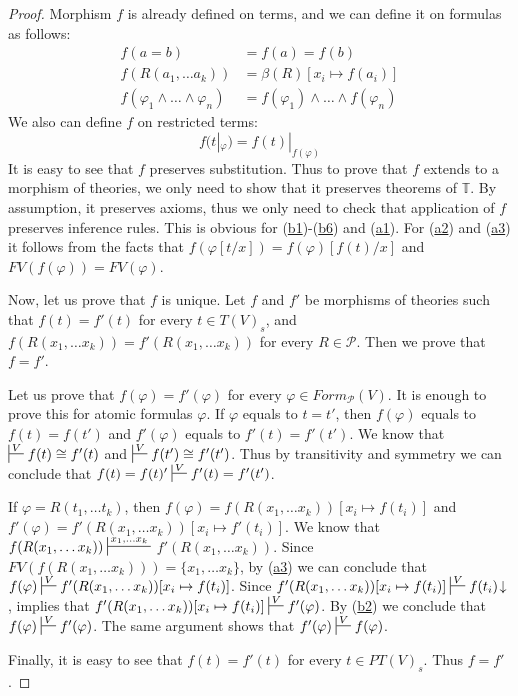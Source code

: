 \documentclass[reqno]{amsart}
\newcommand{\axref}[1]{(\hyperref[ax:#1]{#1})}
\theoremstyle{definition}
\theoremstyle{remark}
\numberwithin{figure}{section}
\begin{document}
\begin{proof}
Morphism $f$ is already defined on terms, and we can define it on formulas as follows:
\begin{align*}
f(a = b) & = f(a) = f(b) \\
f(R(a_1, \ldots a_k)) & = \beta(R)[x_i \mapsto f(a_i)] \\
f(\varphi_1 \land \ldots \land \varphi_n) & = f(\varphi_1) \land \ldots \land f(\varphi_n)
\end{align*}
We also can define $f$ on restricted terms:
\[ f(t|_\varphi) = f(t)|_{f(\varphi)} \]
It is easy to see that $f$ preserves substitution.
Thus to prove that $f$ extends to a morphism of theories, we only need to show that it preserves theorems of $\mathbb{T}$.
By assumption, it preserves axioms, thus we only need to check that application of $f$ preserves inference rules.
This is obvious for \axref{b1}-\axref{b6} and \axref{a1}.
For \axref{a2} and \axref{a3} it follows from the facts that $f(\varphi[t/x]) = f(\varphi)[f(t)/x]$ and $FV(f(\varphi)) = FV(\varphi)$.

Now, let us prove that $f$ is unique.
Let $f$ and $f'$ be morphisms of theories such that $f(t) = f'(t)$ for every $t \in T(V)_s$, and
    $f(R(x_1, \ldots x_k)) = f'(R(x_1, \ldots x_k))$ for every $R \in \mathcal{P}$.
Then we prove that $f = f'$.

Let us prove that $f(\varphi) = f'(\varphi)$ for every $\varphi \in Form_\mathcal{P}(V)$.
It is enough to prove this for atomic formulas $\varphi$.
If $\varphi$ equals to $t = t'$, then $f(\varphi)$ equals to $f(t) = f(t')$ and $f'(\varphi)$ equals to $f'(t) = f'(t')$.
We know that $\sststile{}{V} f(t) \cong f'(t)$ and $\sststile{}{V} f(t') \cong f'(t')$.
Thus by transitivity and symmetry we can conclude that $f(t) = f(t)' \sststile{}{V} f'(t) = f'(t')$.

If $\varphi = R(t_1, \ldots t_k)$, then $f(\varphi) = f(R(x_1, \ldots x_k))[x_i \mapsto f(t_i)]$
    and $f'(\varphi) = f'(R(x_1, \ldots x_k))[x_i \mapsto f'(t_i)]$.
We know that $f(R(x_1, \ldots x_k)) \sststile{}{x_1, \ldots x_k}$ \linebreak $f'(R(x_1, \ldots x_k))$.
Since $FV(f(R(x_1, \ldots x_k))) = \{ x_1, \ldots x_k \}$, by \axref{a3} we can conclude that $f(\varphi) \sststile{}{V} f'(R(x_1, \ldots x_k))[x_i \mapsto f(t_i)]$.
Since $f'(R(x_1, \ldots x_k))[x_i \mapsto f(t_i)] \sststile{}{V} f(t_i)\!\downarrow$,  implies that
    $f'(R(x_1, \ldots x_k))[x_i \mapsto f(t_i)] \sststile{}{V} f'(\varphi)$.
By \axref{b2} we conclude that $f(\varphi) \sststile{}{V} f'(\varphi)$.
The same argument shows that $f'(\varphi) \sststile{}{V} f(\varphi)$.

Finally, it is easy to see that $f(t) = f'(t)$ for every $t \in PT(V)_s$.
Thus $f = f'$.
\end{proof}
\end{document}
